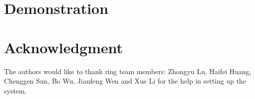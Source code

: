 \documentclass[10pt,conference,balance,letterpaper]{IEEEtran}
\begin{document}
\section{Demonstration}




%




\section*{Acknowledgment}


The authors would like to thank ring team members: Zhongyu Lu, Haifei Huang, Chenggen Sun, Bo Wu, Jianfeng Wen and Xue Li for the help in setting up the system.







%
%
%







\end{document}
